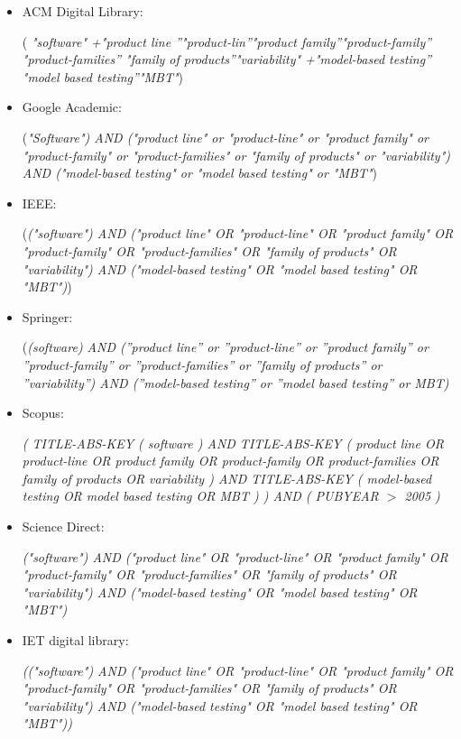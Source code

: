 \begin{itemize}
	\item ACM Digital Library:
	
	(	\textit{"software" +"product line ''"product-lin''"product family''"product-family''\\	
		"product-families''	"family of products''"variability" +"model-based testing''\\"model based testing''"MBT"})
	
	\item Google Academic:
	
	(\textit{"Software") AND ("product line" or "product-line" or "product family" or \\"product-family" or "product-families" or "family of products" or "variability") AND ("model-based testing" or "model based testing" or "MBT"})
	
	\item IEEE:
	
	(\textit{("software") AND ("product line" OR "product-line" OR "product family" OR \\"product-family" OR "product-families" OR "family of products" OR "variability") AND ("model-based testing" OR "model based testing" OR "MBT")})
	
	\item Springer:
	
	(\textit{(software)  AND  (''product line'' or ''product-line'' or ''product family'' or \\''product-family'' or ''product-families'' or ''family of products'' or ''variability'')  AND  (''model-based testing'' or ''model based testing'' or MBT)}
	
	\item Scopus:
	
	\textit{( TITLE-ABS-KEY ( software )  AND  TITLE-ABS-KEY ( {product line}  OR  \\{product-line}  OR  {product family}  OR  {product-family}  OR  {product-families}  OR  {family of products}  OR  {variability} )  AND  TITLE-ABS-KEY ( {model-based testing}  OR  {model based testing}  OR  {MBT} ) )  AND  ( PUBYEAR  $>$  2005 ) }
	
	\item Science Direct:
	
	\textit{("software") AND ("product line" OR "product-line" OR "product family" OR \\"product-family" OR "product-families" OR "family of products" OR "variability") AND ("model-based testing" OR "model based testing" OR "MBT")}
	
	\item IET digital library:
	
	\textit{(("software") AND ("product line" OR "product-line" OR "product family" OR \\"product-family" OR "product-families" OR "family of products" OR "variability") AND ("model-based testing" OR "model based testing" OR "MBT"))}
\end{itemize}


